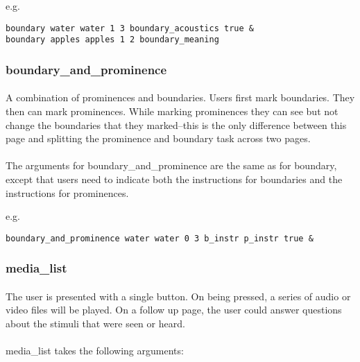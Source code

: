 e.g.

\begin{lstlisting}
boundary water water 1 3 boundary_acoustics true &
boundary apples apples 1 2 boundary_meaning
\end{lstlisting}


\subsubsection{boundary\_and\_prominence}

\paragraph{}
A combination of prominences and boundaries.  Users first mark boundaries.  They then can mark prominences.  While marking prominences they can see but not change the boundaries that they marked--this is the only difference between this page and splitting the prominence and boundary task across two pages.

\paragraph{}
The arguments for boundary\_and\_prominence are the same as for boundary, except that users need to indicate both the instructions for boundaries and the instructions for prominences.

e.g.
\begin{lstlisting}
boundary_and_prominence water water 0 3 b_instr p_instr true &
\end{lstlisting}


\subsubsection{media\_list}

\paragraph{}
The user is presented with a single button.  On being pressed, a series of audio or video files will be played.  On a follow up page, the user could answer questions about the stimuli that were seen or heard.

\paragraph{}
media\_list takes the following arguments:

